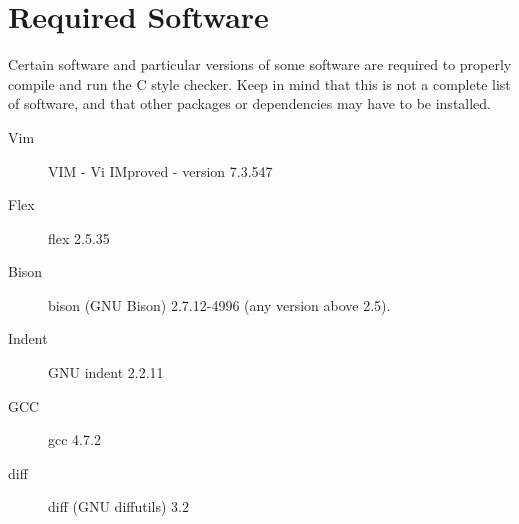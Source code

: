 \chapter{Required Software}
\label{chap:software}
Certain software and particular versions of some software are required to
properly compile and run the C style checker.
Keep in mind that this is not a complete list of software, and that other packages or dependencies may
have to be installed.

\begin{description}
    \item[Vim]  VIM - Vi IMproved - version 7.3.547
    \item[Flex] flex 2.5.35
    \item[Bison] bison (GNU Bison) 2.7.12-4996 (any version above 2.5).
    \item[Indent] GNU indent 2.2.11
    \item[GCC] gcc 4.7.2
    \item[diff] diff (GNU diffutils) 3.2
\end{description}
